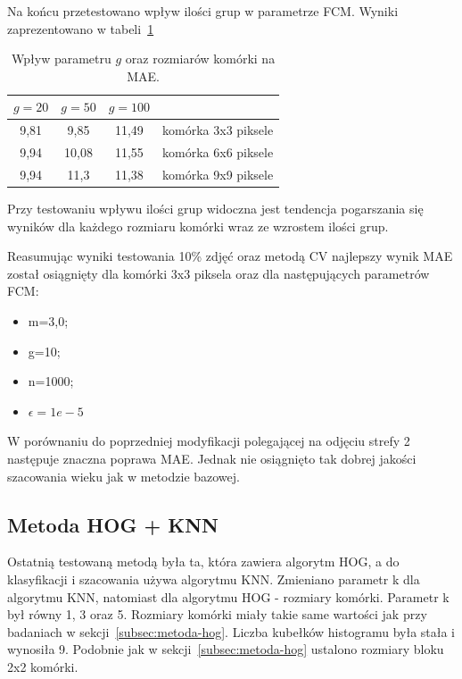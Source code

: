 \documentclass[a4paper,twoside,12pt]{book}
\begin{document}
    Na końcu przetestowano wpływ ilości grup w parametrze FCM.
    Wyniki zaprezentowano w tabeli~\ref{tab.hog21}
    \begin{table}[h!]
        \centering
        \caption{Wpływ parametru $g$ oraz rozmiarów komórki na MAE.}
        \begin{tabular}{|c|c|c|c|}
            \hline
            $g=20$ & $g=50$ & $g=100$ &                     \\ \hline
            9,81 & 9,85 & 11,49 & komórka 3x3 piksele \\ \hline
            9,94 & 10,08 & 11,55 & komórka 6x6 piksele \\ \hline
            9,94 & 11,3 & 11,38 & komórka 9x9 piksele \\ \hline
        \end{tabular}
        \label{tab.hog21}
    \end{table}

    Przy testowaniu wpływu ilości grup widoczna jest tendencja pogarszania się wyników dla każdego rozmiaru komórki
    wraz ze wzrostem ilości grup.

    Reasumując wyniki testowania 10\% zdjęć oraz metodą CV najlepszy wynik MAE został osiągnięty dla komórki 3x3
    piksela oraz dla następujących parametrów FCM:
    \begin{itemize}
        \item m=3,0;
        \item g=10;
        \item n=1000;
        \item $\epsilon=1e-5$
    \end{itemize}

    W porównaniu do poprzedniej modyfikacji polegającej na odjęciu strefy 2 następuje znaczna poprawa MAE.
    Jednak nie osiągnięto tak dobrej jakości szacowania wieku jak w metodzie bazowej.

    \subsection{Metoda HOG + KNN}\label{subsec:metoda-hog-+-knn}
    Ostatnią testowaną metodą była ta, która zawiera algorytm HOG, a do klasyfikacji i szacowania używa algorytmu KNN.
    Zmieniano parametr k dla algorytmu KNN, natomiast dla algorytmu HOG - rozmiary komórki.
    Parametr k był równy 1, 3 oraz 5. Rozmiary komórki miały takie same wartości jak przy badaniach w
    sekcji~\ref{subsec:metoda-hog}.
    Liczba kubełków histogramu była stała i wynosiła 9. Podobnie jak w sekcji~\ref{subsec:metoda-hog} ustalono rozmiary
    bloku 2x2 komórki.
\end{document}
